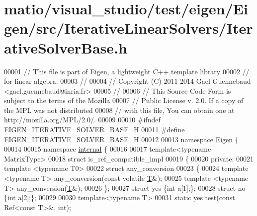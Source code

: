 \hypertarget{matio_2visual__studio_2test_2eigen_2_eigen_2src_2_iterative_linear_solvers_2_iterative_solver_base_8h_source}{}\section{matio/visual\+\_\+studio/test/eigen/\+Eigen/src/\+Iterative\+Linear\+Solvers/\+Iterative\+Solver\+Base.h}
\label{matio_2visual__studio_2test_2eigen_2_eigen_2src_2_iterative_linear_solvers_2_iterative_solver_base_8h_source}

\begin{DoxyCode}
00001 \textcolor{comment}{// This file is part of Eigen, a lightweight C++ template library}
00002 \textcolor{comment}{// for linear algebra.}
00003 \textcolor{comment}{//}
00004 \textcolor{comment}{// Copyright (C) 2011-2014 Gael Guennebaud <gael.guennebaud@inria.fr>}
00005 \textcolor{comment}{//}
00006 \textcolor{comment}{// This Source Code Form is subject to the terms of the Mozilla}
00007 \textcolor{comment}{// Public License v. 2.0. If a copy of the MPL was not distributed}
00008 \textcolor{comment}{// with this file, You can obtain one at http://mozilla.org/MPL/2.0/.}
00009 
00010 \textcolor{preprocessor}{#ifndef EIGEN\_ITERATIVE\_SOLVER\_BASE\_H}
00011 \textcolor{preprocessor}{#define EIGEN\_ITERATIVE\_SOLVER\_BASE\_H}
00012 
00013 \textcolor{keyword}{namespace }\hyperlink{namespace_eigen}{Eigen} \{ 
00014 
00015 \textcolor{keyword}{namespace }\hyperlink{namespaceinternal}{internal} \{
00016 
00017 \textcolor{keyword}{template}<\textcolor{keyword}{typename} MatrixType>
00018 \textcolor{keyword}{struct }is\_ref\_compatible\_impl
00019 \{
00020 \textcolor{keyword}{private}:
00021   \textcolor{keyword}{template} <\textcolor{keyword}{typename} T0>
00022   \textcolor{keyword}{struct }any\_conversion
00023   \{
00024     \textcolor{keyword}{template} <\textcolor{keyword}{typename} T> any\_conversion(\textcolor{keyword}{const} \textcolor{keyword}{volatile} \hyperlink{group___sparse_core___module_class_eigen_1_1_triplet}{T}&);
00025     \textcolor{keyword}{template} <\textcolor{keyword}{typename} T> any\_conversion(\hyperlink{group___sparse_core___module_class_eigen_1_1_triplet}{T}&);
00026   \};
00027   \textcolor{keyword}{struct }yes \{\textcolor{keywordtype}{int} a[1];\};
00028   \textcolor{keyword}{struct }no  \{\textcolor{keywordtype}{int} a[2];\};
00029 
00030   \textcolor{keyword}{template}<\textcolor{keyword}{typename} T>
00031   \textcolor{keyword}{static} yes test(\textcolor{keyword}{const} Ref<const T>&, \textcolor{keywordtype}{int});

\end{DoxyCode}

